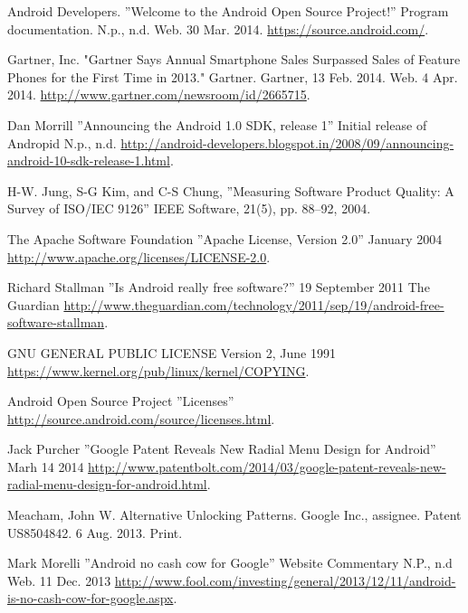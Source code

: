 \documentclass[conference]{IEEEtran}
\begin{document}
\begin{thebibliography}{1}


Android Developers. ''Welcome to the Android Open Source Project!'' Program documentation. N.p., n.d. Web. 30 Mar. 2014. \url{https://source.android.com/}.

Gartner, Inc. "Gartner Says Annual Smartphone Sales Surpassed Sales of Feature Phones for the First Time in 2013." Gartner. Gartner, 13 Feb. 2014. Web. 4 Apr. 2014. \url{http://www.gartner.com/newsroom/id/2665715}.

Dan Morrill ''Announcing the Android 1.0 SDK, release 1'' Initial release of Andropid N.p., n.d. \url{http://android-developers.blogspot.in/2008/09/announcing-android-10-sdk-release-1.html}.

H-W. Jung, S-G Kim, and C-S Chung, ''Measuring Software Product Quality: A Survey of ISO/IEC 9126'' IEEE Software, 21(5), pp. 88--92, 2004.

The Apache Software Foundation ''Apache License, Version 2.0'' January 2004 \url{http://www.apache.org/licenses/LICENSE-2.0}.

Richard Stallman ''Is Android really free software?'' 19 September 2011 The Guardian \url{http://www.theguardian.com/technology/2011/sep/19/android-free-software-stallman}.

GNU GENERAL PUBLIC LICENSE Version 2, June 1991
\url{https://www.kernel.org/pub/linux/kernel/COPYING}.

Android Open Source Project ''Licenses'' \url{http://source.android.com/source/licenses.html}.

Jack Purcher ''Google Patent Reveals New Radial Menu Design for Android'' Marh 14 2014 \url{http://www.patentbolt.com/2014/03/google-patent-reveals-new-radial-menu-design-for-android.html}.

Meacham, John W. Alternative Unlocking Patterns. Google Inc., assignee. Patent US8504842. 6 Aug. 2013. Print.

Mark Morelli ''Android no cash cow for Google'' Website Commentary N.P., n.d Web. 11 Dec. 2013 \url{http://www.fool.com/investing/general/2013/12/11/android-is-no-cash-cow-for-google.aspx}.


\end{thebibliography}
\end{document}
